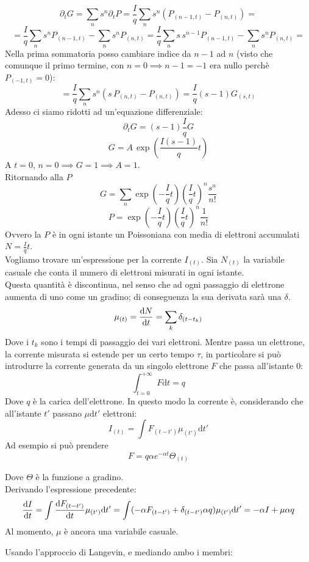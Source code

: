 \documentclass[a4paper,12pt]{article}
\renewcommand{\arg}[1]{_{(#1)}}
\theoremstyle{plain}
\theoremstyle{definition}
\newcommand{\f}[2]{\frac{#1}{#2}}
\newcommand{\tdv}{\partial_t}
\renewcommand{\d}{\text{d}}
\theoremstyle{remark}
\begin{document}
	\[\tdv G=\sum_n s^n \tdv P=	\f{I}{q}\sum_n s^n \left(P\arg{n-1,t}-P\arg{n,t}\right)=	\]
	\[=\f{I}{q}\sum_n s^n P\arg{n-1,t}-\sum_n s^nP\arg{n,t}=\f{I}{q}\sum_n s\,s^{n-1} P\arg{n-1,t}-\sum_n s^nP\arg{n,t}=\]
	Nella prima sommatoria posso cambiare indice da $n-1$  ad $n$ (visto che comunque il primo termine, con $n=0\implies n-1=-1$ era nullo perchè $P\arg{-1,t}=0$):
	\[=\f{I}{q}\sum_n s^{n}\left( s\,P\arg{n,t}- P\arg{n,t}\right)=\f{I}{q}(s-1) G\arg{s,t}\]
	Adesso ci siamo ridotti ad un'equazione differenziale:
	\[\tdv G=(s-1)\f{I}{q}G			\]
	\[G=A\,\exp({ \f{I(s-1)}{q}t})\]
	A $t=0$, $n=0\implies G=1\implies A=1$.\\
	Ritornando alla $P$
	\[G=\sum_n \exp(-\f{I}{q}t) \left(\f{I}{q}t\right)^n\f{s^n}{n!}			\]
	\[P=\exp(-\f{I}{q}t) \left(\f{I}{q}t\right)^n\f{1}{n!}	\]
	Ovvero la $P$ è in ogni istante un Poissoniana con media di elettroni accumulati $N=\f{I}{q}t$.\\
	Vogliamo trovare un'espressione per la corrente $I\arg{t}$. Sia $N\arg{t}$ la variabile casuale che conta il numero di elettroni misurati in ogni istante.
	\\Questa quantità è discontinua, nel senso che ad ogni passaggio di elettrone aumenta di uno come un gradino; di conseguenza la sua derivata sarà una $\delta$.
	\[\mu\arg{t}=\dv{N}{t}=\sum_k \delta\arg{t-t_k}\]
Dove i $t_k$ sono i tempi di passaggio dei vari elettroni.
Mentre passa un elettrone, la corrente misurata si estende per un certo tempo  $\tau$, in particolare si può introdurre la corrente generata da un singolo elettrone $F$ che passa all'istante 0:
		\[\int_{t=0}^{+\infty} F\d t =q			\]
		Dove $q$ è la carica dell'elettrone.
		In questo modo la corrente è, considerando che all'istante $t'$ passano $\mu \d t'$ elettroni:
		\[I\arg{t}=\int F\arg{t-t'} \mu\arg{t'} \d t'			\]
		Ad esempio si può prendere \[F=q\alpha e^{-\alpha t}\Theta\arg{t}\]
		
		Dove $\Theta$ è la funzione a gradino.\\
		Derivando l'espressione precedente:
		\begin{equation}
\dv{I}{t}=\int \dv{F\arg{t-t'}}{t} \mu\arg{t'} \d t'	=\int(-\alpha F\arg{t-t'}+\delta\arg{t-t'} \alpha q) \mu\arg{t'} \d t'	=-\alpha I	+\mu \alpha q	
\label{eq1}
	\end{equation}
		Al momento, $\mu$ è ancora una variabile casuale.
	

		Usando l'approccio di Langevin, e mediando ambo i membri:
\end{document}
